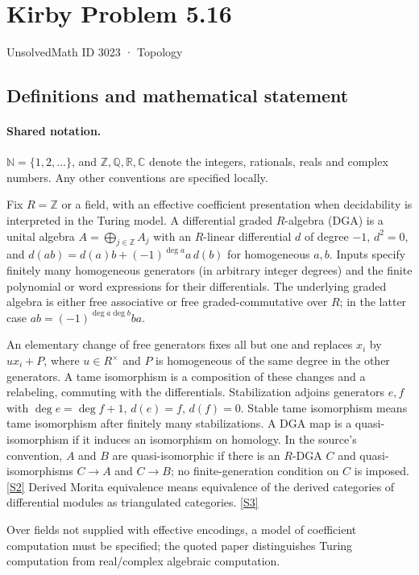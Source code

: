 \documentclass[11pt]{article}
\newcommand{\sref}[2]{\hyperlink{source:#1:#2}{[S#2]}}
\begin{document}
\setcounter{section}{3022}
\section{Kirby Problem 5.16}\label{3023}
{\small\sffamily UnsolvedMath ID 3023 · Topology}
\subsection{Definitions and mathematical statement}

\paragraph{Shared notation.}$\mathbb N=\{1,2,\ldots\}$, and $\mathbb Z,\mathbb Q,\mathbb R,\mathbb C$ denote the integers, rationals, reals and complex numbers. Any other conventions are specified locally.


Fix $R=\mathbb Z$ or a field, with an effective coefficient presentation when decidability is interpreted in the Turing model. A differential graded $R$-algebra (DGA) is a unital algebra $A=\bigoplus_{j\in\mathbb Z}A_j$ with an $R$-linear differential $d$ of degree $-1$, $d^2=0$, and $d(ab)=d(a)b+(-1)^{\deg a}a\,d(b)$ for homogeneous $a,b$. Inputs specify finitely many homogeneous generators (in arbitrary integer degrees) and the finite polynomial or word expressions for their differentials. The underlying graded algebra is either free associative or free graded-commutative over $R$; in the latter case $ab=(-1)^{\deg a\deg b}ba$.

An elementary change of free generators fixes all but one and replaces $x_i$ by $u x_i+P$, where $u\in R^\times$ and $P$ is homogeneous of the same degree in the other generators. A tame isomorphism is a composition of these changes and a relabeling, commuting with the differentials. Stabilization adjoins generators $e,f$ with $\deg e=\deg f+1$, $d(e)=f$, $d(f)=0$. Stable tame isomorphism means tame isomorphism after finitely many stabilizations. A DGA map is a quasi-isomorphism if it induces an isomorphism on homology. In the source's convention, $A$ and $B$ are quasi-isomorphic if there is an $R$-DGA $C$ and quasi-isomorphisms $C\to A$ and $C\to B$; no finite-generation condition on $C$ is imposed. \sref{3023}{2} Derived Morita equivalence means equivalence of the derived categories of differential modules as triangulated categories. \sref{3023}{3}

Over fields not supplied with effective encodings, a model of coefficient computation must be specified; the quoted paper distinguishes Turing computation from real/complex algebraic computation.
\end{document}
